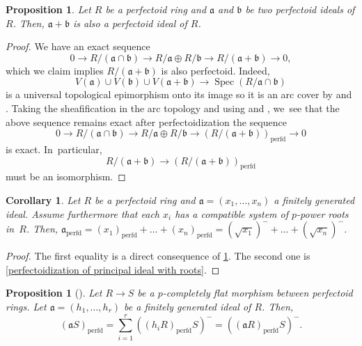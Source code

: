 \documentclass[JEP,XML,SOM,Unicode,published]{cedram}
\let\autoref\cref
\theoremstyle{plain}
\newtheorem{corollary}[theorem]{Corollary}
\newtheorem{proposition}[theorem]{Proposition}
\theoremstyle{definition}
\numberwithin{equation}{theorem}
\newcommand{\fra}{\mathfrak{a}}
\newcommand{\frab}{\mathfrak{b}}
\newcommand{\perfd}{_{\mathrm{perfd}}}
\DeclareMathOperator{\Spec}{{Spec}}
\begin{document}
\begin{proposition}\label{finite sum of perfectoid ideals is perfectoid}
Let $R$ be a perfectoid ring and $\fra$ and $\frab$ be two perfectoid ideals of $R$. Then, $\fra+\frab$ is also a perfectoid ideal of $R$.
\end{proposition}

\begin{proof}
We have an exact sequence
\begin{equation}\label{intersection sum exact sequence}
0\to R/\left(\fra\cap \frab\right) \to R/\fra \oplus R/\frab \to R/\left(\fra + \frab\right)\to 0,
\end{equation}
which we claim implies $R/\left(\fra + \frab\right)$ is also perfectoid. Indeed,
\[
V\left(\fra\right)\cup V\left(\frab\right)\cup V\left(\fra+\frab\right) \to \Spec\left(R/\fra\cap \frab\right)
\]
is a universal topological epimorphism onto its image so it is an arc cover by \cite[Prop.\,2.6]{BhattMathewArcTop} and \cite[Th.\,2.8]{RydhSubmersionsEffectiveDescent}.
Taking the sheafification in the arc topology and using \cite[Cor.\,8.11]{BhattScholzePrisms} and \cite[Th.\,2.9]{BhattScholzeProjectivityWittGrassmannian}, we~see that the above sequence remains exact after perfectoidization \ie the sequence
\[
0\to R/\left(\fra\cap \frab\right) \to R/\fra \oplus R/\frab \to \left(R/\left(\fra + \frab\right)\right)\perfd \to 0
\]
is exact. In~particular,
\[
R/\left(\fra + \frab\right) \to \left(R/\left(\fra + \frab\right)\right)\perfd
\]
must be an isomorphism.
\end{proof}

\begin{corollary}\label{perfectoidization is sum of perfectoidizations}
Let $R$ be a perfectoid ring and $\fra=(x_1,\ldots,x_n)$ a finitely generated ideal. Assume furthermore that each $x_i$ has a compatible system of $p$-power roots in~$R$. Then, $\fra\perfd=(x_1)\perfd+\ldots+(x_n)\perfd=(\sqrt{x_1})^{-}+\ldots + (\sqrt{x_n})^{-}$.
\end{corollary}

\begin{proof}
The first equality is a direct consequence of \autoref{finite sum of perfectoid ideals is perfectoid}. The second one is \autoref{perfectoidization of principal ideal with roots}.
\end{proof}

\begin{proposition}[{\cf \cite[Lem.\,2.4.3]{CaiLeeMaSchwedeTuckerPerfectoidSignature}}]
\label{perfectoid ideal under pcflat extension of pfd rings}
Let $R \to S$ be a $p$-completely flat morphism between perfectoid rings. Let $\fra=(h_1,\ldots,h_r)$ be a finitely generated ideal of $R$.
Then,
\[
(\fra S)\perfd=\sum_{i=1}^r \left((h_i R)\perfd S \right)^{-}=((\fra R)\perfd S)^-.
\]
\end{proposition}
\end{document}
